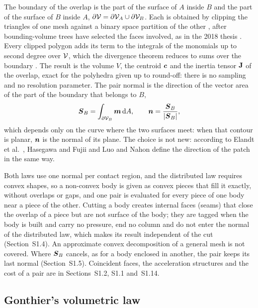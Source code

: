 The boundary of the overlap is the part of the surface of $A$ inside $B$ and the part of the
surface of $B$ inside $A$, $\partial\mathcal{V} = \partial\mathcal{V}_A\cup\partial\mathcal{V}_B$. Each is
obtained by clipping the triangles of one mesh against a binary space partition of the other
\cite{Sutherland1974,Thibault1987}, after bounding-volume trees \cite{vandenBergen1997} have
selected the faces involved, as in the 2018 thesis \cite{Vilela2018}. Every clipped polygon
adds its term to the integrals of the monomials up to second degree over $\mathcal{V}$, which the
divergence theorem reduces to sums over the boundary \cite{Mirtich1996,Eberly2002}. The result
is the volume $V$, the centroid $\boldsymbol{c}$ and the inertia tensor $\mathbf{J}$ of the overlap,
exact for the polyhedra given up to round-off: there is no sampling and no resolution
parameter. The pair normal is the direction of the vector area of the part of the boundary that
belongs to $B$,
\begin{equation}
  \boldsymbol{S}_B = \int_{\partial\mathcal{V}_B} \boldsymbol{m} \,\mathrm{d} A , \qquad \boldsymbol{n} = \frac{\boldsymbol{S}_B}{|\boldsymbol{S}_B|} ,
  \label{eq:normal}
\end{equation}
which depends only on the curve where the two surfaces meet: when that contour is planar, $\boldsymbol{n}$
is the normal of its plane. The choice is not new: according to Elandt et
al.~\cite{Elandt2019}, Hasegawa and Fujii \cite{Hasegawa2003} and Luo and Nahon \cite{Luo2006}
define the direction of the patch in the same way.

Both laws use one normal per contact region, and the distributed law requires convex shapes, so
a non-convex body is given as convex pieces that fill it exactly, without overlaps or gaps, and
one pair is evaluated for every piece of one body near a piece of the other. Cutting a body
creates internal faces (seams) that close the overlap of a piece but are not surface of the
body; they are tagged when the body is built and carry no pressure, end no column and do not
enter the normal of the distributed law, which makes its result independent of the cut
(Section~S1.4). An approximate convex decomposition of a general mesh \cite{Wei2022coacd} is
not covered. Where $\boldsymbol{S}_B$ cancels, as for a body enclosed in another, the pair keeps its
last normal (Section~S1.5). Coincident faces, the acceleration structures and the cost of a
pair are in Sections~S1.2, S1.1 and~S1.14.

\subsection{Gonthier's volumetric law}\label{sec:gonthier}

